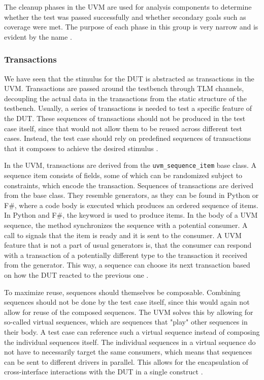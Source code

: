 The cleanup phases in the UVM are used for analysis components to determine whether the test was passed successfully
and whether secondary goals such as coverage were met. The purpose of each phase in this group is very narrow and is
evident by the name \cite[ch. 4.6]{mehta2018asic}.

\subsubsection{Transactions} %

We have seen that the stimulus for the DUT is abstracted as transactions in the UVM. Transactions are passed around
the testbench through TLM channels, decoupling the actual data in the transactions from the static structure of the
testbench. Usually, a series of transactions is needed to test a specific feature
of the DUT. These sequences of transactions should not be produced in the test case itself, since that would not
allow them to be reused across different test cases. Instead, the test case should rely on predefined sequences of
transactions that it composes to achieve the desired stimulus \cite[Ch. 23]{salemi2013uvm}.

In the UVM, transactions are derived from the \texttt{uvm\_sequence\_item} base class. A sequence item consists of
fields, some of which can be randomized subject to constraints, which encode the transaction. Sequences of transactions
are derived from the  base class. They resemble generators, as they can be found in Python or F\#,
where a code body is executed which produces an ordered sequence of items. In Python and F\#, the  keyword
is used to produce items. In the body of a UVM sequence, the  method synchronizes the sequence with
a potential consumer. A call to  signals that the item is ready and it is sent to the consumer. A UVM
feature that is not a part of usual generators is, that the consumer can respond with a transaction of a
potentially different type to the transaction it received from the generator. This way, a sequence can choose its next transaction based on how the DUT reacted to the previous one \cite[Ch. 4.3]{mehta2018asic}.

To maximize reuse, sequences should themselves be composable. Combining sequences should not be done by the test case
itself, since this would again not allow for reuse of the composed sequences. The UVM solves this by allowing for
so-called virtual sequences, which are sequences that "play" other sequences in their body. A test case can reference
such a virtual sequence instead of composing the individual sequences itself. The individual sequences in a virtual
sequence do not have to necessarily target the same consumers, which means that sequences can be sent to different
drivers in parallel. This allows for the encapsulation of cross-interface interactions with the DUT in a single
construct \cite[Ch. 23]{salemi2013uvm}.

